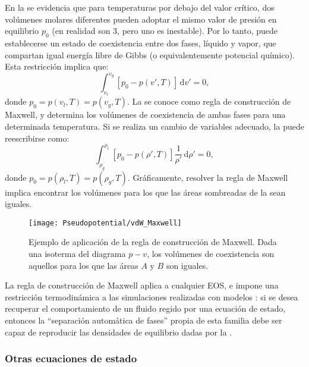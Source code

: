 En la  se evidencia que para temperaturas por debajo del valor cr\'itico, dos vol\'umenes molares diferentes pueden adoptar el mismo valor de presi\'on en equilibrio $p_0$ (en realidad son 3, pero uno es inestable). Por lo tanto, puede establecerse un estado de coexistencia entre dos fases, l\'iquido y vapor, que compartan igual energ\'ia libre de Gibbs (o equivalentemente potencial qu\'imico). Esta restricci\'on implica que:
\begin{equation}
	\int_{v_l}^{v_g} \left[p_0 - p(v',T)\right] \, \mbox{d} v' = 0,
	\label{eq:maxwell_constr}
\end{equation}
donde $p_0 = p(v_l,T) = p(v_g,T)$. La  se conoce como regla de construcci\'on de Maxwell, y determina los vol\'umenes de coexistencia de ambas fases para una determinada temperatura. Si se realiza un cambio de variables adecuado, la  puede reescribirse como:
\begin{equation}
	\int_{\rho_g}^{\rho_l} \left[p_0 - p(\rho',T)\right] \dfrac{1}{\rho'} \, \mbox{d} \rho' = 0,
	\label{eq:maxwell_constr_rho}
\end{equation}
donde $p_0 = p(\rho_l,T) = p(\rho_g,T)$. Gr\'aficamente, resolver la regla de Maxwell implica encontrar los vol\'umenes para los que las \'areas sombreadas de la  sean iguales. 

\begin{figure}[ht]
	\centering
	\texttt{[image: Pseudopotential/vdW\_Maxwell]}
	\caption{Ejemplo de aplicaci\'on de la regla de construcci\'on de Maxwell. Dada una isoterma del diagrama $p-v$, los vol\'umenes de coexistencia son aquellos para los que las \'areas $A$ y $B$ son iguales.}
	\label{fig:vdW_Maxwell}
\end{figure}


La regla de construcci\'on de Maxwell aplica a cualquier EOS, e impone una restricci\'on termodin\'amica a las simulaciones realizadas con modelos \pp{}: si se desea recuperar el comportamiento de un fluido regido por una ecuaci\'on de estado, entonces la ``separaci\'on autom\'atica de fases'' propia de esta familia debe ser capaz de reproducir las densidades de equilibrio dadas por la .


\subsubsection*{Otras ecuaciones de estado}

